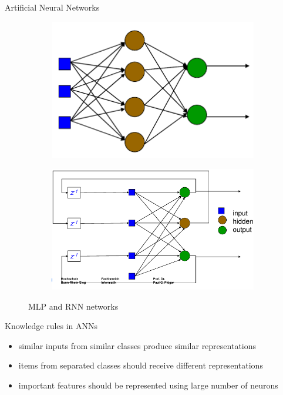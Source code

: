 \documentclass[9pt,t]{beamer}
\begin{document}
\begin{frame}{Artificial Neural Networks}
    \begin{figure}[htp!]
        \centering
        \begin{subfigure}{.5\textwidth}
            \centering
            \includegraphics[width=.7\linewidth]{../images/mlp.png}
        \end{subfigure}%
        \begin{subfigure}{.5\textwidth}
            \centering
            \includegraphics[width=\linewidth]{../images/rnn.png}
        \end{subfigure}
        \caption{MLP and RNN networks}
    \end{figure}
    \begin{alertblock}{Knowledge rules in ANNs}
        \begin{itemize}
            \item similar inputs from similar classes produce similar representations
            \item items from separated classes should receive different representations
            \item important features should be represented using large number of neurons

\end{itemize}
\end{alertblock}
\end{frame}
\end{document}
